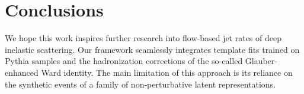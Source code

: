 \section{Conclusions}\label{sec:conclusions}

We hope this work inspires further research into flow-based jet rates of
deep inelastic scattering. Our framework seamlessly integrates template
fits trained on Pythia samples and the hadronization corrections of the
so-called Glauber-enhanced Ward identity. The main limitation of this
approach is its reliance on the synthetic events of a family of
non-perturbative latent representations.

